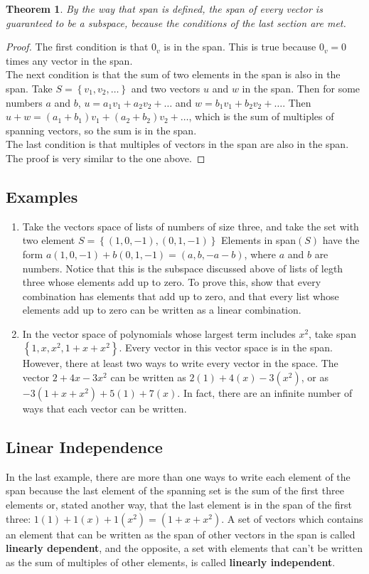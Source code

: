 \documentclass{article}
\newtheorem*{theorem}{Theorem}
\begin{document}
    \begin{theorem}
        By the way that span is defined, the span of every vector is guaranteed to be a subspace, because the conditions of the last section are met.
    \end{theorem}
    \begin{proof}
        The first condition is that $0_v$ is in the span. This is true because $0_v = 0$ times any vector in the span.\\
        The next condition is that the sum of two elements in the span is also in the span.
        Take $S = \left\{v_1, v_2, \dots\right\}$ and two vectors $u$ and $w$ in the span.
        Then for some numbers $a$ and $b$, $u = a_1 v_1 + a_2 v_2 + \dots$ and $w = b_1 v_1 + b_2 v_2 + \dots$. Then $u + w = (a_1 + b_1) v_1 + (a_2 + b_2) v_2 + \dots$, which is the sum of multiples of spanning vectors, so the sum is in the span.\\
        The last condition is that multiples of vectors in the span are also in the span. The proof is very similar to the one above.
    \end{proof}
    \subsection{Examples}
        \begin{enumerate}
            \item
                Take the vectors space of lists of numbers of size three, and take the set with two element $S = \left\{(1, 0, -1), (0,1,-1)\right\}$
                Elements in span$(S)$ have the form $a(1, 0, -1) + b(0, 1, -1) = (a, b, -a-b)$, where $a$ and $b$  are numbers. Notice that this is the subspace discussed above of lists of legth three whose elements add up to zero. To prove this, show that every combination has elements that add up to zero, and that every list whose elements add up to zero can be written as a linear combination.
            \item 
                In the vector space of polynomials whose largest term includes $x^2$, take span$\left\{1, x, x^2, 1+x+x^2 \right\}$. Every vector in this vector space is in the span. However, there at least two ways to write every vector in the space. The vector $2 + 4x - 3x^2$ can be written as $2(1) + 4(x) - 3(x^2)$, or as $-3(1+x+x^2) + 5(1) + 7(x)$. In fact, there are an infinite number of ways that each vector can be written.
        \end{enumerate}
    \subsection{Linear Independence}
        In the last example, there are more than one ways to write each element of the span because the last element of the spanning set is the sum of the first three elements or, stated another way, that the last element is in the span of the first three: $1(1) + 1(x) + 1(x^2) = (1+x+x^2)$. A set of vectors which contains an element that can be written as the span of other vectors in the span is called \textbf{linearly dependent}, and the opposite, a set with elements that can't be written as the sum of multiples of other elements, is called \textbf{linearly independent}.
       
\end{document}
